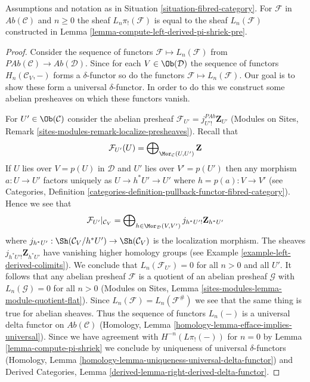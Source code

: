 \begin{lemma}
\label{lemma-compute-left-derived-pi-shriek}
Assumptions and notation as in Situation \ref{situation-fibred-category}.
For $\mathcal{F}$ in $\textit{Ab}(\mathcal{C})$ and $n \geq 0$
the sheaf $L_n\pi_!(\mathcal{F})$ is equal to the sheaf
$L_n(\mathcal{F})$ constructed in
Lemma \ref{lemma-compute-left-derived-pi-shriek-pre}.
\end{lemma}

\begin{proof}
Consider the sequence of functors $\mathcal{F} \mapsto L_n(\mathcal{F})$
from $\textit{PAb}(\mathcal{C}) \to \textit{Ab}(\mathcal{D})$.
Since for each $V \in \Ob(\mathcal{D})$ the sequence of functors
$H_n(\mathcal{C}_V, - )$ forms a $\delta$-functor
so do the functors $\mathcal{F} \mapsto L_n(\mathcal{F})$.
Our goal is to show these form a universal $\delta$-functor.
In order to do this we construct some abelian presheaves
on which these functors vanish.

\medskip\noindent
For $U' \in \Ob(\mathcal{C})$ consider the abelian presheaf
$\mathcal{F}_{U'} = j_{U'!}^{\textit{PAb}}\mathbf{Z}_{U'}$
(Modules on Sites, Remark \ref{sites-modules-remark-localize-presheaves}).
Recall that
$$
\mathcal{F}_{U'}(U) =
\bigoplus\nolimits_{\Mor_\mathcal{C}(U, U')} \mathbf{Z}
$$
If $U$ lies over $V = p(U)$ in $\mathcal{D}$ and $U'$ lies over $V' = p(U')$
then any morphism $a : U \to U'$ factors uniquely as $U \to h^*U' \to U'$
where $h = p(a) : V \to V'$ (see
Categories, Definition
\ref{categories-definition-pullback-functor-fibred-category}).
Hence we see that
$$
\mathcal{F}_{U'}|_{\mathcal{C}_V}
=
\bigoplus\nolimits_{h \in \Mor_\mathcal{D}(V, V')}
j_{h^*U'!}\mathbf{Z}_{h^*U'}
$$
where $j_{h^*U'} : \Sh(\mathcal{C}_V/h^*U') \to \Sh(\mathcal{C}_V)$
is the localization morphism. The sheaves $j_{h^*U'!}\mathbf{Z}_{h^*U'}$
have vanishing higher homology groups (see
Example \ref{example-left-derived-colimits}).
We conclude that $L_n(\mathcal{F}_{U'}) = 0$ for all $n > 0$ and all $U'$.
It follows that any abelian presheaf $\mathcal{F}$ is a quotient
of an abelian presheaf $\mathcal{G}$ with $L_n(\mathcal{G}) = 0$ for
all $n > 0$ (Modules on Sites, Lemma
\ref{sites-modules-lemma-module-quotient-flat}).
Since $L_n(\mathcal{F}) = L_n(\mathcal{F}^\#)$ we see
that the same thing is true for abelian sheaves. Thus
the sequence of functors $L_n(-)$ is a universal delta functor
on $\textit{Ab}(\mathcal{C})$
(Homology, Lemma \ref{homology-lemma-efface-implies-universal}).
Since we have agreement with
$H^{-n}(L\pi_!(-))$ for $n = 0$ by
Lemma \ref{lemma-compute-pi-shriek}
we conclude by uniqueness of universal $\delta$-functors
(Homology, Lemma \ref{homology-lemma-uniqueness-universal-delta-functor})
and
Derived Categories, Lemma \ref{derived-lemma-right-derived-delta-functor}.
\end{proof}

